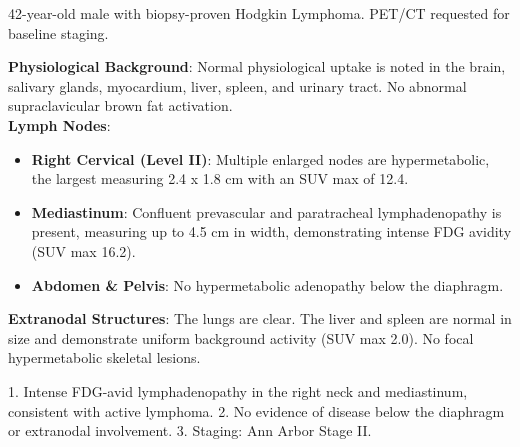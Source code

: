 \begin{testbox}[Indications:]
42-year-old male with biopsy-proven Hodgkin Lymphoma. PET/CT requested for baseline staging.
\end{testbox}
\begin{refbox}[Findings:]
\textbf{Physiological Background}: Normal physiological uptake is noted in the brain, salivary glands, myocardium, liver, spleen, and urinary tract. No abnormal supraclavicular brown fat activation.\\
\textbf{Lymph Nodes}:
\begin{itemize}
    \item \textbf{Right Cervical (Level II)}: Multiple enlarged nodes are hypermetabolic, the largest measuring 2.4 x 1.8 cm with an SUV max of 12.4.
    \item \textbf{Mediastinum}: Confluent prevascular and paratracheal lymphadenopathy is present, measuring up to 4.5 cm in width, demonstrating intense FDG avidity (SUV max 16.2).
    \item \textbf{Abdomen \& Pelvis}: No hypermetabolic adenopathy below the diaphragm.\\
\end{itemize}
\textbf{Extranodal Structures}: The lungs are clear. The liver and spleen are normal in size and demonstrate uniform background activity (SUV max 2.0). No focal hypermetabolic skeletal lesions.
\end{refbox}
\begin{pearlbox}[Impression:]
1. Intense FDG-avid lymphadenopathy in the right neck and mediastinum, consistent with active lymphoma.
2. No evidence of disease below the diaphragm or extranodal involvement.
3. Staging: Ann Arbor Stage II.
\end{pearlbox}

\clearpage
